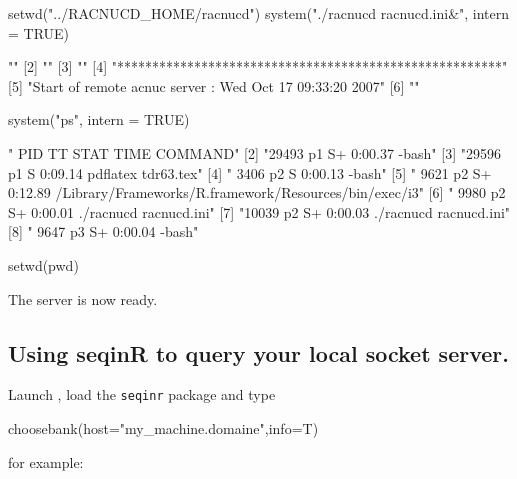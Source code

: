 \documentclass{article}
\begin{document}
\begin{Schunk}
\begin{Sinput}
 setwd("../RACNUCD_HOME/racnucd")
 system("./racnucd racnucd.ini&", intern = TRUE)
\end{Sinput}
\begin{Soutput}
[1] ""                                                       
[2] ""                                                       
[3] ""                                                       
[4] "*******************************************************"
[5] "Start of remote acnuc server : Wed Oct 17 09:33:20 2007"
[6] ""                                                       
\end{Soutput}
\begin{Sinput}
 system("ps", intern = TRUE)
\end{Sinput}
\begin{Soutput}
[1] "  PID  TT  STAT      TIME COMMAND"                                              
[2] "29493  p1  S+     0:00.37 -bash"                                                
[3] "29596  p1  S      0:09.14 pdflatex tdr63.tex"                                   
[4] " 3406  p2  S      0:00.13 -bash"                                                
[5] " 9621  p2  S+     0:12.89 /Library/Frameworks/R.framework/Resources/bin/exec/i3"
[6] " 9980  p2  S+     0:00.01 ./racnucd racnucd.ini"                                
[7] "10039  p2  S+     0:00.03 ./racnucd racnucd.ini"                                
[8] " 9647  p3  S+     0:00.04 -bash"                                                
\end{Soutput}
\begin{Sinput}
 setwd(pwd)
\end{Sinput}
\end{Schunk}

The server is now ready.

\subsection{Using seqinR to query your local socket server.}
Launch \Rlogo{}, load the \texttt{seqinr} package  and type

\begin{Schunk}
\begin{Sinput}
choosebank(host="my_machine.domaine",info=T)
\end{Sinput}
\end{Schunk}
for example:
\end{document}
